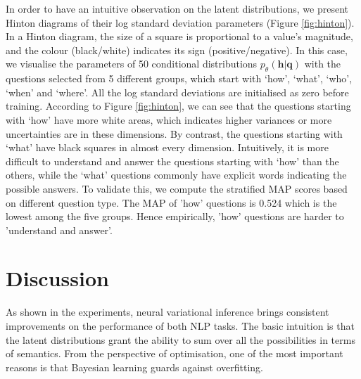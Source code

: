 \documentclass{article}
\newcommand{\tmmathbf}[1]{\ensuremath{\boldsymbol{#1}}}
\begin{document}
In order to have an intuitive observation on the latent distributions, we present Hinton diagrams of their log standard deviation parameters (Figure \ref{fig:hinton}). In a Hinton diagram, the size of a square is proportional to a value's magnitude, and the colour (black/white) indicates its sign (positive/negative). In this case, we visualise the parameters of 50 conditional distributions $p_{\theta}(\tmmathbf{h}|\tmmathbf{q})$ with the questions selected from 5 different groups, which start with `how', `what', `who', `when' and `where'. All the log standard deviations are initialised as zero before training.  According to Figure \ref{fig:hinton}, we can see that the questions starting with `how' have more white areas, which indicates higher variances or more uncertainties are in these dimensions. By contrast, the questions starting with `what' have black squares in almost every dimension. Intuitively, it is more difficult to understand and answer the questions starting with `how' than the others, while the `what' questions commonly have explicit words indicating the possible answers. To validate this, we compute the stratified MAP scores based on different question type. The MAP of 'how' questions is 0.524 which is the lowest among the five groups. Hence empirically,  'how' questions are harder to 'understand and answer'.

\section{Discussion}
As shown in the experiments, neural variational inference brings consistent improvements on the performance of both NLP tasks. The basic intuition is that the latent distributions grant the ability to sum over all the possibilities in terms of semantics. From the perspective of optimisation, one of the most important reasons is that Bayesian learning guards against overfitting. 
\end{document}
